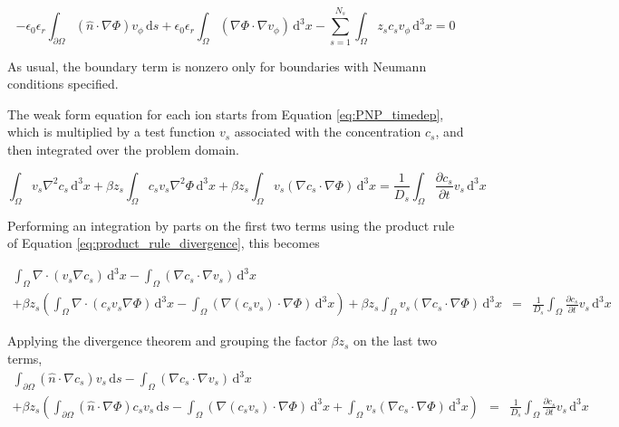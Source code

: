 \begin{equation}
-\epsilon_{0}\epsilon_{r} \int_{\partial\Omega} \left( \hat{n} \cdot \nabla \Phi \right) v_\phi \,\mathrm{d}s
+ \epsilon_{0}\epsilon_{r} \int_\Omega  \left( \nabla \Phi \cdot \nabla v_\phi \right) \,\mathrm{d}^3x
- \sum_{s=1}^{N_s} \int_\Omega z_s c_s v_\phi \,\mathrm{d}^3x = 0
\end{equation}

As usual, the boundary term is nonzero only for boundaries with Neumann conditions specified.

The weak form equation for each ion starts from Equation \ref{eq:PNP_timedep},
which is multiplied by a test function $v_s$ associated with the concentration $c_s$,
and then integrated over the problem domain.

\begin{equation}
\int_\Omega v_s \nabla^2 c_s \,\mathrm{d}^3x 
+ \beta z_s \int_\Omega c_s v_s \nabla^2 \Phi \,\mathrm{d}^3x
+ \beta z_s \int_\Omega  v_s \left( \nabla c_s \cdot \nabla \Phi \right) \,\mathrm{d}^3x
= \frac{1}{D_s} \int_\Omega \frac{\partial c_s}{\partial t} v_s \,\mathrm{d}^3x
\end{equation}

Performing an integration by parts on the first two terms
using the product rule of Equation \ref{eq:product_rule_divergence}, this becomes

\begin{equation}
\begin{aligned}
\int_\Omega \nabla \cdot \left( v_s \nabla c_s \right) \,\mathrm{d}^3x
- \int_\Omega \left( \nabla c_s \cdot \nabla v_s \right) \,\mathrm{d}^3x \\
+ \beta z_s \left( \int_\Omega \nabla \cdot \left( c_s v_s \nabla \Phi \right) \,\mathrm{d}^3x
- \int_\Omega \left( \nabla \left( c_s v_s \right)  \cdot \nabla \Phi \right) \,\mathrm{d}^3x \right) 
+ \beta z_s \int_\Omega  v_s \left( \nabla c_s \cdot \nabla \Phi \right) \,\mathrm{d}^3x
& = & \frac{1}{D_s} \int_\Omega \frac{\partial c_s}{\partial t} v_s \,\mathrm{d}^3x
\end{aligned}
\end{equation}

Applying the divergence theorem and grouping the factor $\beta z_s$ on the last two terms,
\begin{equation}
\begin{aligned}
\int_{\partial\Omega} \left( \hat{n} \cdot \nabla c_s \right) v_s \,\mathrm{d}s
- \int_\Omega \left( \nabla c_s \cdot \nabla v_s \right) \,\mathrm{d}^3x \\
+ \beta z_s \left( \int_{\partial\Omega} \left( \hat{n} \cdot \nabla \Phi \right) c_s v_s \,\mathrm{d}s
- \int_\Omega \left( \nabla \left( c_s v_s \right)  \cdot \nabla \Phi \right) \,\mathrm{d}^3x
+ \int_\Omega  v_s \left( \nabla c_s \cdot \nabla \Phi \right) \,\mathrm{d}^3x \right) 
& = & \frac{1}{D_s} \int_\Omega \frac{\partial c_s}{\partial t} v_s \,\mathrm{d}^3x
\end{aligned}
\end{equation}

